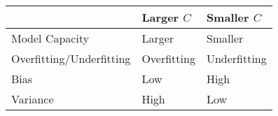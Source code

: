 \begin{center}
\begin{tabular}{|l|l|l|}
  \hline                          & Larger $C$  & Smaller $C$ \\
  \hline Model Capacity           & Larger      & Smaller     \\
  \hline Overfitting/Underfitting & Overfitting & Underfitting\\
  \hline Bias                     & Low         & High        \\
  \hline Variance                 & High        & Low         \\
  \hline
\end{tabular}
\end{center}
